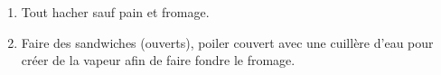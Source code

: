 
\begin{ingredients}
\end{ingredients}


\begin{recipe}
  \begin{enumerate}

  \item Tout hacher sauf pain et fromage.

  \item Faire des sandwiches (ouverts), poiler couvert avec une
    cuillère d'eau pour créer de la vapeur afin de faire fondre le
    fromage.

  \end{enumerate}
\end{recipe}


